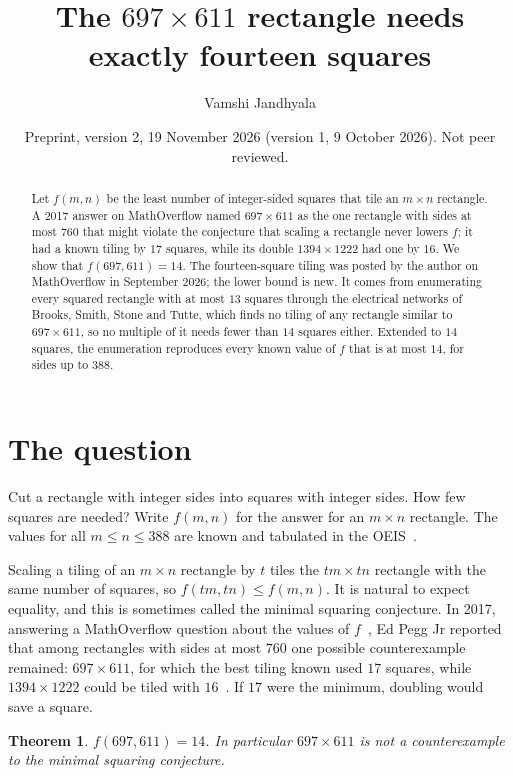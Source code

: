 \documentclass[11pt]{amsart}
\title{The $697\times611$ rectangle needs exactly fourteen squares}
\author{Vamshi Jandhyala}
\date{Preprint, version 2, 19 November 2026 (version 1, 9 October 2026). Not peer reviewed.}
\newtheorem{theorem}{Theorem}
\theoremstyle{remark}
\begin{document}
\begin{abstract}
Let $f(m,n)$ be the least number of integer-sided squares that tile an $m\times n$ rectangle. A 2017
answer on MathOverflow named $697\times611$ as the one rectangle with sides at most $760$ that might
violate the conjecture that scaling a rectangle never lowers $f$: it had a known tiling by $17$
squares, while its double $1394\times1222$ had one by $16$. We show that $f(697,611)=14$. The fourteen-square tiling was posted by the author on MathOverflow in
September 2026; the lower bound is new. It comes from enumerating every squared rectangle with at most $13$
squares through the electrical networks of Brooks, Smith, Stone and Tutte, which finds no tiling of any
rectangle similar to $697\times611$, so no multiple of it needs fewer than $14$ squares either. Extended to $14$ squares, the
enumeration reproduces every known value of $f$ that is at most $14$, for sides up to $388$.
\end{abstract}
\maketitle

\section{The question}

Cut a rectangle with integer sides into squares with integer sides. How few squares are needed? Write
$f(m,n)$ for the answer for an $m\times n$ rectangle. The values for all $m\le n\le 388$ are known and
tabulated in the OEIS~\cite{oeis}.

Scaling a tiling of an $m\times n$ rectangle by $t$ tiles the $tm\times tn$ rectangle with the same
number of squares, so $f(tm,tn)\le f(m,n)$. It is natural to expect equality, and this is sometimes
called the minimal squaring conjecture. In 2017, answering a MathOverflow question about the values of
$f$~\cite{mo}, Ed Pegg Jr reported that among rectangles with sides at most $760$ one possible
counterexample remained: $697\times 611$, for which the best tiling known used $17$ squares, while
$1394\times1222$ could be tiled with $16$~\cite{pegg}. If $17$ were the minimum, doubling would save a
square.

\begin{theorem}\label{thm:main}
$f(697,611)=14$. In particular $697\times611$ is not a counterexample to the minimal squaring
conjecture.
\end{theorem}
\end{document}
